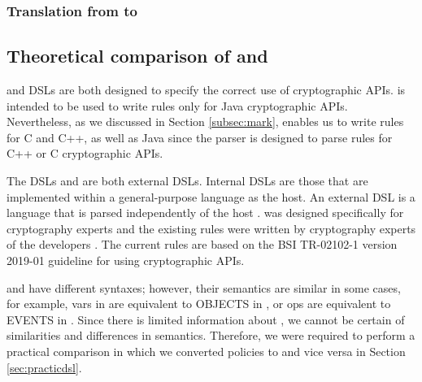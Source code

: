 % 

\subsubsection{Translation from \MARK{} to \crysl{}}

\label{sec:crysltomark}

\subsection{Theoretical comparison of \crysl{} and \MARK{}}
\label{sec:theodsl}

\MARK{} and \crysl{} DSLs are both designed to specify the correct use of cryptographic APIs. \crysl{} is intended to be used to write rules only for Java cryptographic APIs. Nevertheless, as we discussed in Section \ref{subsec:mark}, \MARK{} enables us to write rules for C and C++, as well as Java since the \MARK{} parser is designed to parse \MARK{} rules for C++ or C cryptographic APIs. 

The DSLs \MARK{} and \crysl{} are both external DSLs. Internal DSLs are those that are implemented within a general-purpose language as the host. An external DSL is a language that is parsed independently of the host \cite{dsl}. \crysl{} was designed specifically for cryptography experts and the existing \crysl{} rules were written by cryptography experts of the \crysl{} developers \cite{stefanphd}.
The current \MARK{} rules are based on the BSI \cite{BSI} TR-02102-1 version 2019-01
guideline for using cryptographic APIs.

\crysl{} and \MARK{} have different syntaxes; however, their semantics are similar in some cases, for example, vars in \MARK{} are equivalent to OBJECTS in \crysl, or ops are equivalent to EVENTS in \crysl. Since there is limited information about \MARK, we cannot be certain of similarities and differences in semantics. Therefore, we were required to perform a practical comparison in which we converted \MARK{} policies to \crysl{} and vice versa in Section \ref{sec:practicdsl}.

